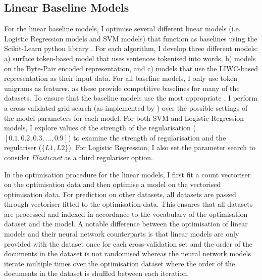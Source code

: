 \subsection{Linear Baseline Models}\label{sec:baseline_models}
For the linear baseline models, I optimise several different linear models (i.e. Logistic Regression models and SVM models) that function as baselines using the Scikit-Learn python library \citet{Pedregosa:2011}.
For each algorithm, I develop three different models: a) surface token-based model that uses sentences tokenised into words, b) models on the Byte-Pair encoded representation, and c) models that use the LIWC-based representation as their input data.
For all baseline models, I only use token unigrams as features, as these provide competitive baselines for many of the datasets.
To ensure that the baseline models use the most appropriate , I perform a cross-validated grid-search (as implemented by \citet{Pedregosa:2011}) over the possible settings of the model parameters for each model.
For both SVM and Logistic Regression models, I explore values of the strength of the regularisation ($[0.1, 0.2, 0.3, \ldots, 0.9]$) to examine the strength of regularisation and the regulariser ($\{L1, L2\}$).
For Logistic Regression, I also set the parameter search to consider \textit{Elasticnet} as a third regulariser option.

In the optimisation procedure for the linear models, I first fit a count vectoriser on the optimisation data and then optimise a model on the vectorised optimisation data.
For prediction on other datasets, all datasets are passed through vectoriser  fitted to the optimisation data.
This ensures that all datasets are processed and indexed in accordance to the vocabulary of the optimisation dataset and the model.
A notable difference between the optimisation of linear models and their neural network counterparts is that linear models are only provided with the dataset once for each cross-validation set and the order of the documents in the dataset is not randomised whereas the neural network models iterate multiple times over the optimisation dataset where the order of the documents in the dataset is  shuffled between each iteration.


